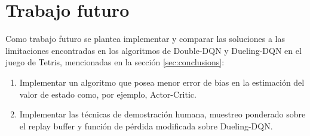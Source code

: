 \section{Trabajo futuro}

Como trabajo futuro se plantea implementar y comparar las soluciones a las limitaciones encontradas en los algoritmos de Double-DQN y Dueling-DQN en el juego de Tetris, mencionadas en la sección \ref{sec:conclusions}:
\begin{enumerate}
    \item Implementar un algoritmo que posea menor error de bias en la estimación del valor de estado como, por ejemplo, Actor-Critic.
    \item Implementar las técnicas de demostración humana, muestreo ponderado sobre el replay buffer y función de pérdida modificada sobre Dueling-DQN.
\end{enumerate}